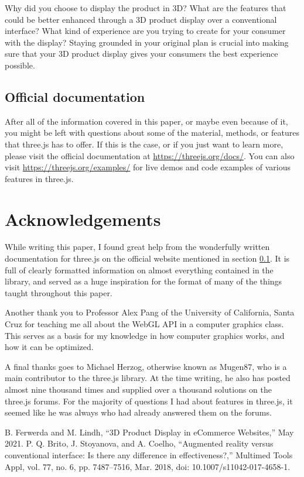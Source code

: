 \documentclass[10pt,final,journal,compsoc]{IEEEtran}
\begin{document}
    Why did you choose to display the product in 3D? What are the features that could be better enhanced through a 3D product display over a conventional interface? What kind of experience are you trying to create for your consumer with the display? Staying grounded in your original plan is crucial into making sure that your 3D product display gives your consumers the best experience possible.

    \subsection{Official documentation} \label{documentation}
    After all of the information covered in this paper, or maybe even because of it, you might be left with questions about some of the material, methods, or features that three.js has to offer. If this is the case, or if you just want to learn more, please visit the official documentation at \url{https://threejs.org/docs/}. You can also visit \url{https://threejs.org/examples/} for live demos and code examples of various features in three.js.



\appendices

\section*{Acknowledgements}
While writing this paper, I found great help from the wonderfully written documentation for three.js on the official website mentioned in section \ref{documentation}. It is full of clearly formatted information on almost everything contained in the library, and served as a huge inspiration for the format of many of the things taught throughout this paper.

Another thank you to Professor Alex Pang of the University of California, Santa Cruz for teaching me all about the WebGL API in a computer graphics class. This serves as a basis for my knowledge in how computer graphics works, and how it can be optimized.

A final thanks goes to Michael Herzog, otherwise known as Mugen87, who is a main contributor to the three.js library. At the time writing, he also has posted almost nine thousand times and supplied over a thousand solutions on the three.js forums. For the majority of questions I had about features in three.js, it seemed like he was always who had already answered them on the forums.


\begin{thebibliography}{3}
B. Ferwerda and M. Lindh, “3D Product Display in eCommerce Websites,” May 2021.
P. Q. Brito, J. Stoyanova, and A. Coelho, “Augmented reality versus conventional interface: Is there any difference in effectiveness?,” Multimed Tools Appl, vol. 77, no. 6, pp. 7487–7516, Mar. 2018, doi: 10.1007/s11042-017-4658-1.
\end{thebibliography}
\end{document}
